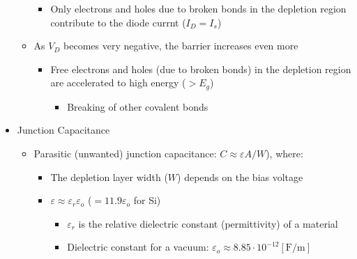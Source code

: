 \begin{itemize}
\begin{itemize}
\begin{itemize}
          \item Only electrons and holes due to broken bonds in the depletion region contribute to the diode currnt ($I_D=I_s$)

        \end{itemize}

      \item As $V_D$ becomes very negative, the barrier increases even more

        \begin{itemize}

          \item Free electrons and holes (due to broken bonds) in the depletion region are accelerated to high energy ($>E_g$)

            \begin{itemize}

              \item Breaking of other covalent bonds

            \end{itemize}

        \end{itemize}

    \end{itemize}

  \item Junction Capacitance

    \begin{itemize}

      \item Parasitic (unwanted) junction capacitance: $C\approx \varepsilon A/W$), where:

        \begin{itemize}

          \item The depletion layer width ($W$) depends on the bias voltage

          \item $\varepsilon\approx \varepsilon_r\varepsilon_o$ ($=11.9\varepsilon_o$ for Si)

            \begin{itemize}

              \item $\varepsilon_r$ is the relative dielectric constant (permittivity) of a material

              \item Dielectric constant for a vacuum: $\varepsilon_o\approx 8.85\cdot10^{-12}[\si{\farad}/\si{\meter}]$


\end{itemize}
\end{itemize}
\end{itemize}
\end{itemize}
